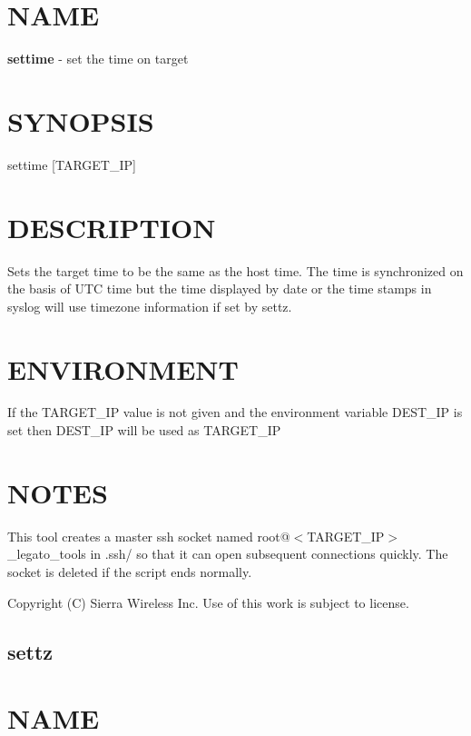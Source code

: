 \section*{N\+A\+M\+E}

{\bfseries settime} -\/ set the time on target

\section*{S\+Y\+N\+O\+P\+S\+I\+S}

{\ttfamily settime \mbox{[}T\+A\+R\+G\+E\+T\+\_\+\+I\+P\mbox{]}}~\newline


\section*{D\+E\+S\+C\+R\+I\+P\+T\+I\+O\+N}

Sets the target time to be the same as the host time. The time is synchronized on the basis of U\+T\+C time but the time displayed by date or the time stamps in syslog will use timezone information if set by settz.

\section*{E\+N\+V\+I\+R\+O\+N\+M\+E\+N\+T}

\begin{DoxyVerb}If the TARGET_IP value is not given and the environment variable DEST_IP
is set then DEST_IP will be used as TARGET_IP
\end{DoxyVerb}


\section*{N\+O\+T\+E\+S}

This tool creates a master ssh socket named root@$<$T\+A\+R\+G\+E\+T\+\_\+\+I\+P$>$\+\_\+legato\+\_\+tools in .ssh/ so that it can open subsequent connections quickly. The socket is deleted if the script ends normally.



 Copyright (C) Sierra Wireless Inc. Use of this work is subject to license. \hypertarget{toolsHost_settz}{}\subsection{settz}\label{toolsHost_settz}
\section*{N\+A\+M\+E}

